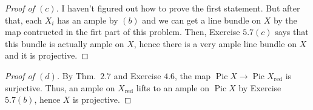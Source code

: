 \documentclass[10pt]{article}
\theoremstyle{definition}
\theoremstyle{remark}
\numberwithin{equation}{section}
\numberwithin{figure}{subsubsection}
\DeclareMathOperator{\Char}{char}
\DeclareMathOperator{\Pic}{Pic}
\newcommand{\FF}{\mathscr{F}}
\newcommand{\OO}{\mathcal{O}}
\newcommand{\red}{\mathrm{red}}
\begin{document}
\begin{proof}[Proof of $(c)$]
  I haven't figured out how to prove the first statement. But after that,
  each $X_i$ has an ample by $(b)$ and we can get a line bundle on $X$ by the map
  contructed in the firt part of this problem. Then, Exercise $5.7(c)$ says that
  this bundle is actually ample on $X$, hence there is a very ample line bundle
  on $X$ and it is projective.
\end{proof}
\begin{proof}[Proof of $(d)$]
  By Thm.\ $2.7$ and Exercise $4.6$, the map $\Pic X \to \Pic X_\red$ is
  surjective. Thus, an ample on $X_\red$ lifts to an ample on $\Pic X$ by
  Exercise $5.7(b)$, hence $X$ is projective.
\end{proof}


\setcounter{subsection}{7}
\end{document}
